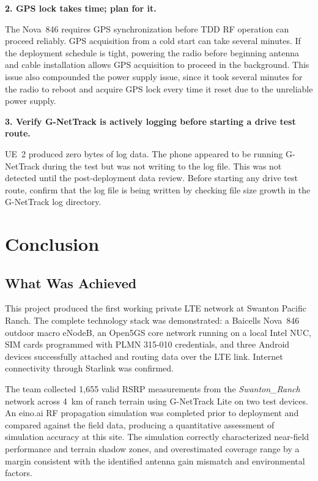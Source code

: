 \documentclass[
    left=1.5in,
    right=1.25in,
    top=1.25in,
    bottom=1.25in
]{CalPolySeniorProject}
\begin{document}
\textbf{2. GPS lock takes time; plan for it.}

The Nova~846 requires GPS synchronization before TDD RF operation can proceed
reliably. GPS acquisition from a cold start can take several minutes. If the
deployment schedule is tight, powering the radio before beginning antenna and
cable installation allows GPS acquisition to proceed in the background. This
issue also compounded the power supply issue, since it took several minutes for
the radio to reboot and acquire GPS lock every time it reset due to the
unreliable power supply.

\textbf{3. Verify G-NetTrack is actively logging before starting a drive test
route.}

UE~2 produced zero bytes of log data. The phone appeared to be running
G-NetTrack during the test but was not writing to the log file. This was not
detected until the post-deployment data review. Before starting any drive test
route, confirm that the log file is being written by checking file size growth
in the G-NetTrack log directory.

\section{Conclusion}

\subsection{What Was Achieved}

This project produced the first working private LTE network at Swanton Pacific
Ranch. The complete technology stack was demonstrated: a Baicells Nova~846
outdoor macro eNodeB, an Open5GS core network running on a local Intel NUC, SIM
cards programmed with PLMN 315-010 credentials, and three Android devices
successfully attached and routing data over the LTE link. Internet connectivity
through Starlink was confirmed.

The team collected 1,655 valid RSRP measurements from the
\textit{Swanton\_Ranch} network across 4~km of ranch terrain using G-NetTrack
Lite on two test devices. An eino.ai RF propagation simulation was completed
prior to deployment and compared against the field data, producing a quantitative
assessment of simulation accuracy at this site. The simulation correctly
characterized near-field performance and terrain shadow zones, and overestimated
coverage range by a margin consistent with the identified antenna gain mismatch
and environmental factors.
\end{document}
